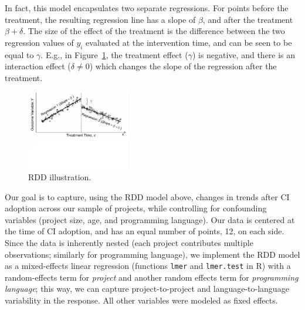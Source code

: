 
In fact, this model encapsulates two separate regressions.
For points before the treatment, the resulting regression line has a slope of 
$\beta$, and after the treatment $\beta + \delta$.
The size of the effect of the treatment is the difference between the two 
regression values of $y_i$ evaluated at the intervention time,
and can be seen to be equal to $\gamma$.
E.g., in Figure~\ref{RDDIllustration}, the treatment effect ($\gamma$) 
is negative, and there is an interaction effect ($\delta \neq 0$) which changes 
the slope of the regression after the treatment.

\begin{figure}[t]
	\centering
	\includegraphics[width=0.4\textwidth, clip=true, trim=0 250 0 0]{figures/rdd.pdf}
	\caption{RDD illustration.}\vspace{-0.4cm}
	\label{RDDIllustration}
\end{figure}

Our goal is to capture, using the RDD model above, changes in trends after CI 
adoption across our sample of projects, while controlling for confounding variables 
(\eg project size, age, and programming language).
Our data is centered at the time of CI adoption, and has an equal number of points, 
12, on each side.
Since the data is inherently nested (each project contributes multiple observations; 
similarly for programming language), we implement the RDD model as a 
mixed-effects linear regression (functions \texttt{lmer} and \texttt{lmer.test} in R) 
with a random-effects term for \emph{project} and another random effects term 
for \emph{programming language}; this way, we can capture project-to-project and 
language-to-language variability in the response.
All other variables were modeled as fixed effects.

